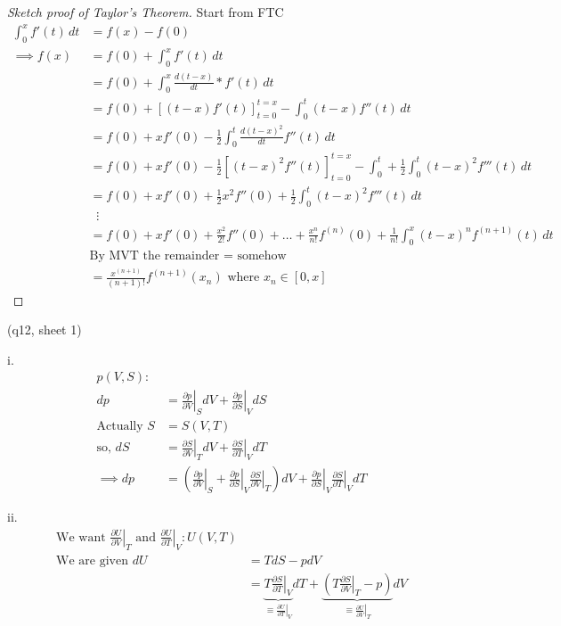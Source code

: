 \begin{proof}[Sketch proof of Taylor's Theorem]
Start from FTC
\begin{align*}
    \int_{0}^{x} f'(t) \,dt &= f(x) - f(0) \\
    \implies f(x) &= f(0) + \int_{0}^{x} f'(t) \,dt \\
    &= f(0) + \int_{0}^{x} \frac{d (t - x)}{d t} * f'(t) \,dt \\
    &= f(0) + [ (t - x) f'(t)]^{t = x}_{t = 0} - \int_{0}^{t} (t - x) f''(t) \,dt \\
    &= f(0) + xf'(0) - \frac{1}{2} \int_{0}^{t} \frac{d (t-x)^2}{d t} f''(t) \,dt \\
    &= f(0) + xf'(0) - \frac{1}{2} [(t-x)^2 f''(t)]^{t = x}_{t = 0} - \int_{0}^{t} + \frac{1}{2} \int_{0}^{t} (t - x)^2 f'''(t) \,dt \\
    &= f(0) + xf'(0) + \frac{1}{2} x^2 f''(0) + \frac{1}{2} \int_{0}^{t} (t - x)^2 f'''(t) \,dt \\
    &\;\;\vdots \\
    &= f(0) + xf'(0) + \frac{x^2}{2!} f''(0) + \ldots + \frac{x^n}{n!} f^{(n)}(0) + \frac{1}{n!} \int_{0}^{x} (t - x)^n f^{(n + 1)}(t) \,dt \\
    &\text{By MVT the remainder = somehow} \\
    &= \frac{x^{(n+1)}}{(n + 1)!} f^{(n + 1)}(x_n) \text{ where } x_n \in [0, x]
\end{align*}
\end{proof}


(q12, sheet 1)

i. 
\begin{align*}
    p(V, S): \\
    dp &= \left. \frac{\partial p}{\partial V} \right|_S dV + \left. \frac{\partial p}{\partial S} \right|_V dS \\
    \text{Actually } S &= S(V, T) \\
    \text{so, } dS &= \left. \frac{\partial S}{\partial V} \right|_{T} dV + \left. \frac{\partial S}{\partial T} \right|_{V} dT \\
    \implies dp &= \left( \left. \frac{\partial p}{\partial V} \right|_{S} + \left. \frac{\partial p}{\partial S} \right|_{V} \left. \frac{\partial S}{\partial V} \right|_{T} \right) dV + \left. \frac{\partial p}{\partial S} \right|_{V} \left. \frac{\partial S}{\partial T} \right|_{V} dT
\end{align*} 

ii. \begin{align*}
    \text{We want } \left. \frac{\partial U}{\partial V} \right|_{T} \text{ and } \left. \frac{\partial U}{\partial T} \right|_{V} : U(V, T) \\
    \text{We are given } dU &= TdS - pdV \\
    &= \underbrace{T \left. \frac{\partial S}{\partial T} \right|_{V}}_{\equiv \left. \frac{\partial U}{\partial T} \right|_{V}} dT + \underbrace{ \left( T \left. \frac{\partial S}{\partial V} \right|_{T} - p \right)}_{\equiv \left. \frac{\partial U}{\partial V} \right|_{T}} dV
\end{align*} 

